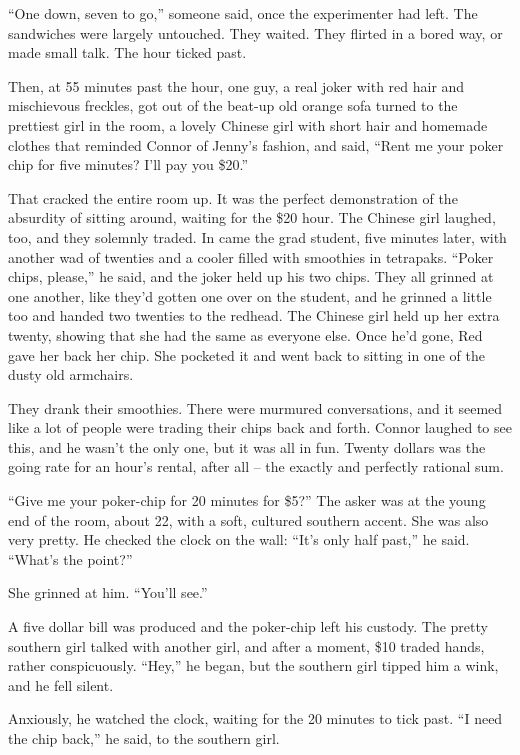 ``One down, seven to go,'' someone said, once the experimenter had
left. The sandwiches were largely untouched. They waited. They
flirted in a bored way, or made small talk. The hour ticked past.

Then, at 55 minutes past the hour, one guy, a real joker with red
hair and mischievous freckles, got out of the beat-up old orange
sofa turned to the prettiest girl in the room, a lovely Chinese
girl with short hair and homemade clothes that reminded Connor of
Jenny's fashion, and said, ``Rent me your poker chip for five
minutes? I'll pay you \$20.''

That cracked the entire room up. It was the perfect demonstration
of the absurdity of sitting around, waiting for the \$20 hour. The
Chinese girl laughed, too, and they solemnly traded. In came the
grad student, five minutes later, with another wad of twenties and
a cooler filled with smoothies in tetrapaks. ``Poker chips, please,''
he said, and the joker held up his two chips. They all grinned at
one another, like they'd gotten one over on the student, and he
grinned a little too and handed two twenties to the redhead. The
Chinese girl held up her extra twenty, showing that she had the
same as everyone else. Once he'd gone, Red gave her back her chip.
She pocketed it and went back to sitting in one of the dusty old
armchairs.

They drank their smoothies. There were murmured conversations, and
it seemed like a lot of people were trading their chips back and
forth. Connor laughed to see this, and he wasn't the only one, but
it was all in fun. Twenty dollars was the going rate for an hour's
rental, after all -- the exactly and perfectly rational sum.

``Give me your poker-chip for 20 minutes for \$5?'' The asker was at
the young end of the room, about 22, with a soft, cultured southern
accent. She was also very pretty. He checked the clock on the wall:
``It's only half past,'' he said. ``What's the point?''

She grinned at him. ``You'll see.''

A five dollar bill was produced and the poker-chip left his
custody. The pretty southern girl talked with another girl, and
after a moment, \$10 traded hands, rather conspicuously. ``Hey,'' he
began, but the southern girl tipped him a wink, and he fell
silent.

Anxiously, he watched the clock, waiting for the 20 minutes to tick
past. ``I need the chip back,'' he said, to the southern girl.


